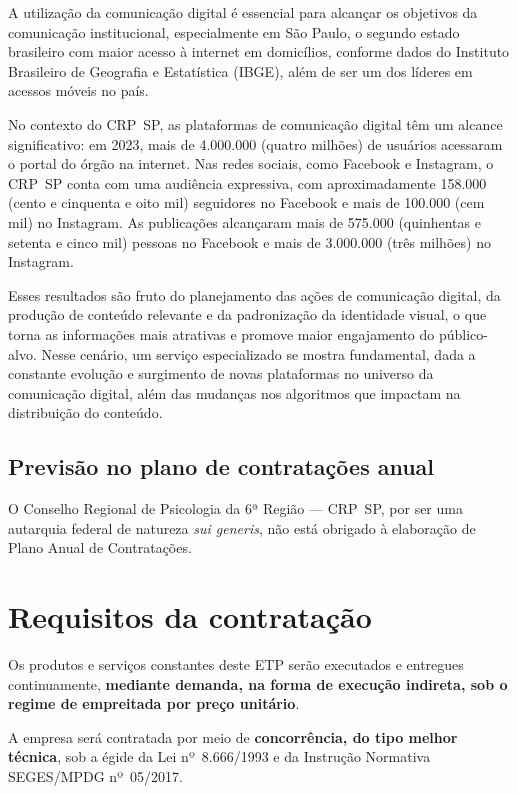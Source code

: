 \documentclass[oneside,a4paper,article]{memoir}
\begin{document}
A utilização da comunicação digital é essencial para alcançar os
objetivos da comunicação institucional, especialmente em São Paulo, o
segundo estado brasileiro com maior acesso à internet em domicílios,
conforme dados do Instituto Brasileiro de Geografia e Estatística
(IBGE), além de ser um dos líderes em acessos móveis no país.

No contexto do CRP~SP, as plataformas de comunicação digital têm um
alcance significativo: em 2023, mais de 4.000.000 (quatro milhões) de
usuários acessaram o portal do órgão na internet. Nas redes sociais,
como Facebook e Instagram, o CRP~SP conta com uma audiência expressiva,
com aproximadamente 158.000 (cento e cinquenta e oito mil) seguidores no
Facebook e mais de 100.000 (cem mil) no Instagram. As publicações
alcançaram mais de 575.000 (quinhentas e setenta e cinco mil) pessoas no
Facebook e mais de 3.000.000 (três milhões) no Instagram.

Esses resultados são fruto do planejamento das ações de comunicação
digital, da produção de conteúdo relevante e da padronização da
identidade visual, o que torna as informações mais atrativas e promove
maior engajamento do público-alvo. Nesse cenário, um serviço
especializado se mostra fundamental, dada a constante evolução e
surgimento de novas plataformas no universo da comunicação digital, além
das mudanças nos algoritmos que impactam na distribuição do conteúdo.

\section{Previsão no plano de contratações anual}

O Conselho Regional de Psicologia da 6ª Região --- CRP~SP, por ser uma
autarquia federal de natureza \emph{sui generis}, não está obrigado à
elaboração de Plano Anual de Contratações.

\chapter{Requisitos da contratação}

Os produtos e serviços constantes deste ETP serão executados e entregues
continuamente, \textbf{mediante demanda, na forma de execução indireta,
	sob o regime de empreitada por preço unitário}.

A empresa será contratada por meio de \textbf{concorrência, do tipo
	melhor técnica}, sob a égide da Lei nº~8.666/1993 e da Instrução
Normativa SEGES/MPDG nº~05/2017.
\end{document}
